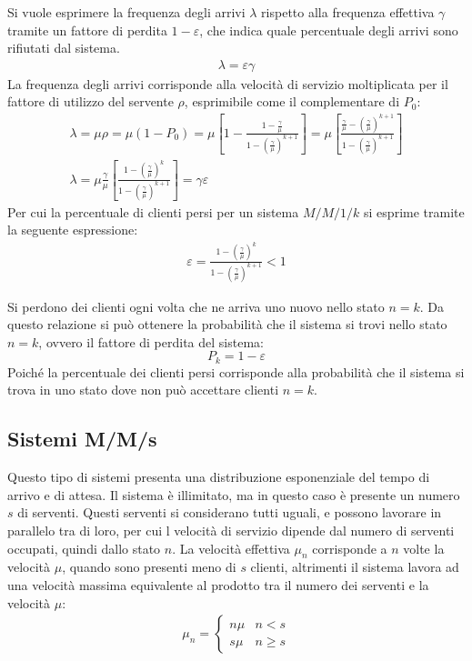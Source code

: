 \documentclass{article}
\numberwithin{equation}{subsection}
\begin{document}
Si vuole esprimere la frequenza degli arrivi $\lambda$ rispetto alla frequenza effettiva $\gamma$ tramite un fattore di perdita $1-\varepsilon$, che indica quale percentuale 
degli arrivi sono rifiutati dal sistema. 
\begin{gather*}
    \lambda=\varepsilon\gamma
\end{gather*}
La frequenza degli arrivi corrisponde alla velocità di servizio moltiplicata per il fattore di utilizzo del servente $\rho$, esprimibile come il complementare di $P_0$:
\begin{gather*}
    \lambda=\mu\rho=\mu(1-P_0)=\mu\left[1-\displaystyle\frac{1-\displaystyle\frac{\gamma}{\mu}}{1-\displaystyle\left(\frac{\gamma}{\mu}\right)^{k+1}}\right]=\mu\left[\displaystyle\frac{\displaystyle\frac{\gamma}{\mu}-\left(\frac{\gamma}{\mu}\right)^{k+1}}{1-\displaystyle\left(\frac{\gamma}{\mu}\right)^{k+1}}\right]\\
    \lambda=\mu\displaystyle\frac{\gamma}{\mu}\left[\displaystyle\frac{\displaystyle1-\left(\frac{\gamma}{\mu}\right)^{k}}{1-\displaystyle\left(\frac{\gamma}{\mu}\right)^{k+1}}\right]=\gamma\varepsilon
\end{gather*}
Per cui la percentuale di clienti persi per un sistema $M/M/1/k$ si esprime tramite la seguente espressione:
\begin{gather}
    \varepsilon=\displaystyle\frac{\displaystyle1-\left(\frac{\gamma}{\mu}\right)^{k}}{1-\displaystyle\left(\frac{\gamma}{\mu}\right)^{k+1}}<1
\end{gather}

Si perdono dei clienti ogni volta che ne arriva uno nuovo nello stato $n=k$. Da questo relazione si può ottenere la probabilità che il sistema si trovi nello stato 
$n=k$, ovvero il fattore di perdita del sistema:
\begin{equation}
    P_k=1-\varepsilon
\end{equation}
Poiché la percentuale dei clienti persi corrisponde alla probabilità che il sistema si trova in uno stato dove non può accettare clienti $n=k$.

\subsection{Sistemi M/M/s}

Questo tipo di sistemi presenta una distribuzione esponenziale del tempo di arrivo e di attesa. Il sistema è illimitato, ma in questo caso è presente un numero $s$ di 
serventi. Questi serventi si considerano tutti uguali, e possono lavorare in parallelo tra di loro, per cui l velocità di servizio dipende dal numero di serventi 
occupati, quindi dallo stato $n$. La velocità effettiva $\mu_n$ corrisponde a $n$ volte la velocità $\mu$, quando sono presenti meno di $s$ clienti, altrimenti il sistema 
lavora ad una velocità massima equivalente al prodotto tra il numero dei serventi e la velocità $\mu$:
\begin{gather*}
    \mu_n=\begin{cases}
        n\mu &n<s\\ s\mu& n\geq s
    \end{cases}
\end{gather*}
\end{document}
